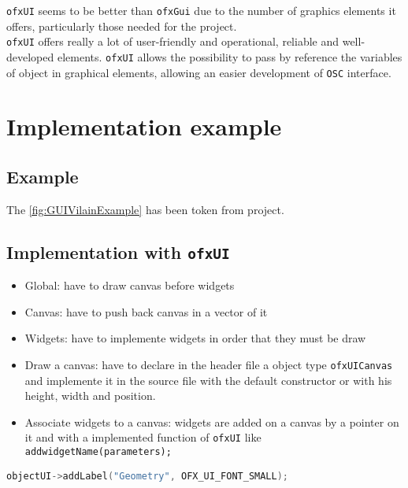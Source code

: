 \documentclass[a4paper,titlepage,oneside]{article}
\begin{document}
\texttt{ofxUI} seems to be better than \texttt{ofxGui} due to the number of graphics elements it offers, particularly those needed for the project.\\\texttt{ofxUI} offers really a lot of user-friendly and operational, reliable and well-developed elements.
\texttt{ofxUI} allows the possibility to pass by reference the variables of object in graphical elements, allowing an easier development of \texttt{OSC} interface.

\newpage
\section{Implementation example}
\subsection{Example}
The \figurename \ref{fig:GUIVilainExample} has been token from \vilain{} project.  \newpage


\subsection{Implementation with \texttt{ofxUI}}
\begin{itemize}
	\item Global: have to draw canvas before widgets
	\item Canvas: have to push back canvas in a vector of it
	\item Widgets: have to implemente widgets in order that they must be draw

	\item Draw a canvas: have to declare in the header file a object type \texttt{ofxUICanvas} and implemente it in the source file with the default constructor or with his height, width and position.
	
	\item Associate widgets to a canvas: widgets are added on a canvas by a pointer on it and with a implemented function of \texttt{ofxUI} like \texttt{addwidgetName(parameters);}
\end{itemize}

\lstinline[language=C++]{objectUI->addLabel("Geometry", OFX_UI_FONT_SMALL);}


\printbibheading
\printbibliography[nottype=online,check=notonline,heading=subbibliography,title={Bibliography}]
\printbibliography[check=online,heading=subbibliography,title={Webography}]
\nocite{openframeworks,ofxUI,REZAALI,OF_TUTORIALS_ofauckland}
\end{document}
